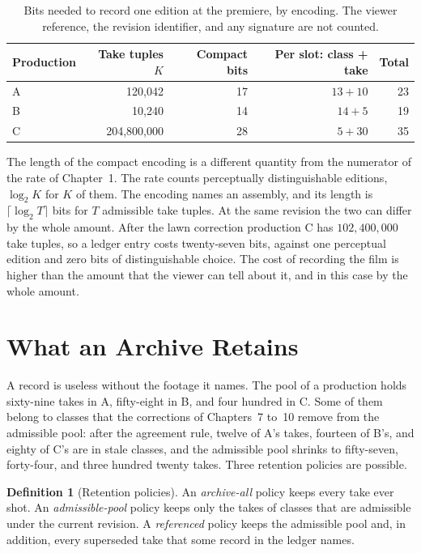 \documentclass[11pt,twoside,openright]{book}
\theoremstyle{plain}
\theoremstyle{definition}
\newtheorem{definition}[theorem]{Definition}
\theoremstyle{remark}
\begin{document}
\begin{table}[ht]
\centering
\begin{tabular}{@{}lrrrr@{}}
\toprule
Production & Take tuples $K$ & Compact bits & Per slot: class + take & Total\\
\midrule
A & 120{,}042 & 17 & $13+10$ & 23\\
B & 10{,}240 & 14 & $14+5$ & 19\\
C & 204{,}800{,}000 & 28 & $5+30$ & 35\\
\bottomrule
\end{tabular}
\caption{Bits needed to record one edition at the premiere, by encoding. The viewer reference, the revision identifier, and any signature are not counted.}\label{tab:rec12}
\end{table}

The length of the compact encoding is a different quantity from the numerator of the rate of Chapter~1. The rate counts perceptually distinguishable editions, $\log_2K$ for $K$ of them. The encoding names an assembly, and its length is $\lceil\log_2T\rceil$ bits for $T$ admissible take tuples. At the same revision the two can differ by the whole amount. After the lawn correction production C has $102{,}400{,}000$ take tuples, so a ledger entry costs twenty-seven bits, against one perceptual edition and zero bits of distinguishable choice. The cost of recording the film is higher than the amount that the viewer can tell about it, and in this case by the whole amount.

\section{What an Archive Retains}\label{sec:archive}

A record is useless without the footage it names. The pool of a production holds sixty-nine takes in A, fifty-eight in B, and four hundred in C. Some of them belong to classes that the corrections of Chapters~7 to~10 remove from the admissible pool: after the agreement rule, twelve of A's takes, fourteen of B's, and eighty of C's are in stale classes, and the admissible pool shrinks to fifty-seven, forty-four, and three hundred twenty takes. Three retention policies are possible.

\begin{definition}[Retention policies]
An \emph{archive-all} policy keeps every take ever shot. An \emph{admissible-pool} policy keeps only the takes of classes that are admissible under the current revision. A \emph{referenced} policy keeps the admissible pool and, in addition, every superseded take that some record in the ledger names.
\end{definition}
\end{document}
